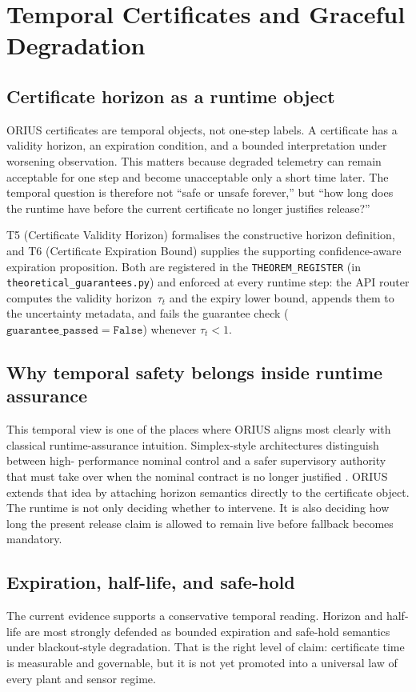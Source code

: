 \chapter{Temporal Certificates and Graceful Degradation}
\label{ch:temporal-certificates-graceful-degradation}

\section{Certificate horizon as a runtime object}
ORIUS certificates are temporal objects, not one-step labels. A certificate has a validity
horizon, an expiration condition, and a bounded interpretation under worsening observation.
This matters because degraded telemetry can remain acceptable for one step and become
unacceptable only a short time later. The temporal question is therefore not ``safe or
unsafe forever,'' but ``how long does the runtime have before the current certificate no
longer justifies release?''

T5 (Certificate Validity Horizon) formalises the constructive horizon definition,
and T6 (Certificate Expiration Bound) supplies the supporting confidence-aware
expiration proposition.  Both are registered in the \texttt{THEOREM\_REGISTER}
(in \texttt{theoretical\_guarantees.py}) and enforced at every runtime step: the API
router computes the validity horizon~$\tau_t$ and the expiry lower bound, appends them to
the uncertainty metadata, and fails the guarantee check ($\texttt{guarantee\_passed} =
\mathtt{False}$) whenever $\tau_t < 1$.

\section{Why temporal safety belongs inside runtime assurance}
This temporal view is one of the places where ORIUS aligns most clearly with classical
runtime-assurance intuition. Simplex-style architectures distinguish between high-
performance nominal control and a safer supervisory authority that must take over when the
nominal contract is no longer justified \cite{sha1998simplex,sha2001using}. ORIUS extends
that idea by attaching horizon semantics directly to the certificate object. The runtime is
not only deciding whether to intervene. It is also deciding how long the present release
claim is allowed to remain live before fallback becomes mandatory.

\section{Expiration, half-life, and safe-hold}
The current evidence supports a conservative temporal reading. Horizon and half-life are
most strongly defended as bounded expiration and safe-hold semantics under blackout-style
degradation. That is the right level of claim: certificate time is measurable and
governable, but it is not yet promoted into a universal law of every plant and sensor
regime.


